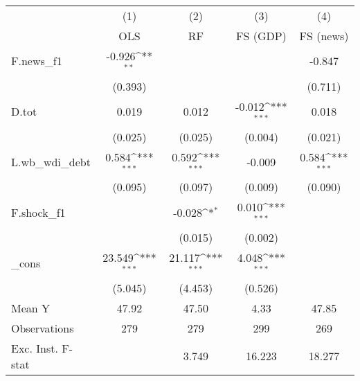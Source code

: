 {
\def\sym#1{\ifmmode^{#1}\else\(^{#1}\)\fi}
\begin{tabular}{l*{4}{c}}
\toprule
            &\multicolumn{1}{c}{(1)}&\multicolumn{1}{c}{(2)}&\multicolumn{1}{c}{(3)}&\multicolumn{1}{c}{(4)}\\
            &\multicolumn{1}{c}{OLS}&\multicolumn{1}{c}{RF}&\multicolumn{1}{c}{FS (GDP)}&\multicolumn{1}{c}{FS (news)}\\
\midrule
F.news\_f1   &      -0.926\sym{**} &                     &                     &      -0.847         \\
            &     (0.393)         &                     &                     &     (0.711)         \\
\addlinespace
D.tot       &       0.019         &       0.012         &      -0.012\sym{***}&       0.018         \\
            &     (0.025)         &     (0.025)         &     (0.004)         &     (0.021)         \\
\addlinespace
L.wb\_wdi\_debt&       0.584\sym{***}&       0.592\sym{***}&      -0.009         &       0.584\sym{***}\\
            &     (0.095)         &     (0.097)         &     (0.009)         &     (0.090)         \\
\addlinespace
F.shock\_f1  &                     &      -0.028\sym{*}  &       0.010\sym{***}&                     \\
            &                     &     (0.015)         &     (0.002)         &                     \\
\addlinespace
\_cons      &      23.549\sym{***}&      21.117\sym{***}&       4.048\sym{***}&                     \\
            &     (5.045)         &     (4.453)         &     (0.526)         &                     \\
\midrule
Mean Y      &       47.92         &       47.50         &        4.33         &       47.85         \\
Observations&         279         &         279         &         299         &         269         \\
Exc. Inst. F-stat&                     &       3.749         &      16.223         &      18.277         \\
\bottomrule
\end{tabular}
}

